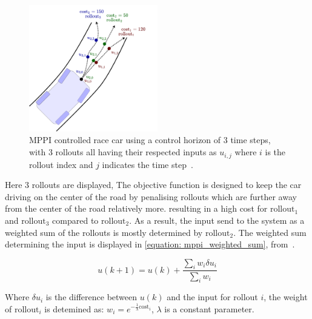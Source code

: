 \begin{figure}[H]
    \centering
    \includegraphics[width=0.5\textwidth]{figures/appendix/MPPI_car_with_rollouts.png}
    \caption{\acs{MPPI} controlled race car using a control horizon of 3 time steps, with 3 rollouts all having their respected inputs as $u_{i,j}$ where $i$ is the rollout index and $j$ indicates the time step~\cite{neuromorphictutorial_ltc21_2021}.}
    \label{figure: mppi_car_with_rollouts}
\end{figure}

Here 3 rollouts are displayed, The objective function is designed to keep the car driving on the center of the road by penalising rollouts which are further away from the center of the road relatively more. resulting in a high cost for $\text{rollout}_1$ and $\text{rollout}_3$ compared to $\text{rollout}_2$. As a result, the input send to the system as a weighted sum of the rollouts is mostly determined by $\text{rollout}_2$. The weighted sum determining the input is displayed in \cref{equation: mppi_weighted_sum}, from~\cite{neuromorphictutorial_ltc21_2021}.

\begin{equation}
u(k+1)=u(k)+\frac{\sum_{i} w_{i} \delta u_{i}}{\sum_{i} w_{i}}
\label{equation: mppi_weighted_sum}
\end{equation}

Where $\delta u_i$ is the difference between $u(k)$ and the input for rollout $i$, the weight of $\text{rollout}_i$ is detemined as: $w_{i}=e^{-\frac{1}{\lambda} \text{cost}_{i}}$, $\lambda$ is a constant parameter.\bs

%
%
%

